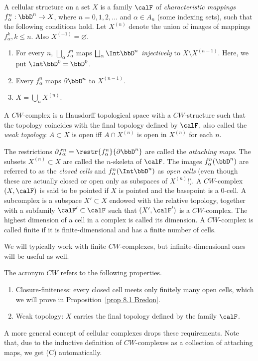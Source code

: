 \begin{defn}[$CW$-complex]
    A cellular structure on a set $X$ is a family $\calF $ of \textit{characteristic mappings} $f_\alpha^n:\bbD^n\to X$, where $n=0,1,2,\ldots$ and $\alpha\in A_n$ (some indexing sets), such that the following conditions hold. Let $X^{(n)}$ denote the union of images of mappings $f_\alpha^k, k\leq n$. Also $X^{(-1)}=\varnothing$.
    \begin{enumerate}
        \item For every $n$, $\bigsqcup_\alpha f_\alpha^n$ maps $\bigsqcup_\alpha \Int \bbD^n$ \emph{injectively} to $X\setminus X^{(n-1)}$. Here, we put $\Int \bbD^0=\bbD^0$.
        \item Every $f_\alpha^n$ maps $\partial \bbD^n$ to $X^{(n-1)}$.
        \item $X=\bigcup_n X^{(n)}$.
    \end{enumerate}
    
    A $CW$-complex is a Hausdorff topological space with a $CW$-structure such that the topology coincides with the final topology defined by $\calF $, also called the \emph{weak topology}: $A\subset X$ is open iff $A\cap X^{(n)}$ is open in $X^{(n)}$ for each $n$.

    The restrictions $\partial f_\alpha^n=\restr{f_\alpha^n}{\partial \bbD^n}$ are called the \textit{attaching maps}. The subsets $X^{(n)}\subset X$ are called the $n$-skeleta of $\calF $. The images $f_\alpha^n(\bbD^n)$ are referred to as the \textit{closed cells} and $f_\alpha^n(\Int  \bbD^n)$ as \textit{open cells} (even though these are actually closed or open only as subspaces of $X^{(n)}$!). A $CW$-complex $(X,\calF )$ is said to be pointed if $X$ is pointed and the basepoint is a $0$-cell. A subcomplex is a subspace $X'\subset X$ endowed with the relative topology, together with a subfamily $\calF '\subset\calF $ such that $(X',\calF ')$ is a $CW$-complex. The highest dimension of a cell in a complex is called its dimension. A $CW$-complex is called finite if it is finite-dimensional and has a finite number of cells.
\end{defn}

We will typically work with finite $CW$-complexes, but infinite-dimensional ones will be useful as well.

\begin{rem}
The acronym $CW$ refers to the following properties.
\begin{enumerate}
    \item Closure-finiteness: every closed cell meets only finitely many open cells, which we will prove in Proposition~\ref{prop 8.1 Bredon}.
    \item Weak topology: $X$ carries the final topology defined by the family $\calF $.
\end{enumerate}
A  more general concept of cellular complexes drops these requirements. Note that, due to the inductive definition of $CW$-complexes as a collection of attaching maps, we get (C) automatically.
\end{rem}

